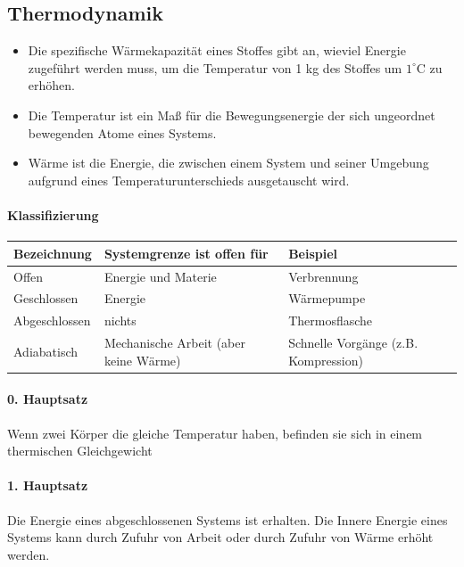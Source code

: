 \documentclass[
a4paper,
oneside,
landscape, 
8pt,
]{scrartcl}
\begin{document}
\begin{multicols*}{2}
\clearpage


\section{Thermodynamik}
\begin{itemize}
	\item Die spezifische Wärmekapazität eines Stoffes gibt an, wieviel Energie zugeführt werden muss, um die Temperatur von 1 kg des Stoffes um $1^\circ \text{C}$ zu erhöhen.
	\item Die Temperatur ist ein Maß für die Bewegungsenergie der sich ungeordnet bewegenden Atome eines Systems.
	\item Wärme ist die Energie, die zwischen einem System und seiner Umgebung aufgrund eines Temperaturunterschieds ausgetauscht wird.
\end{itemize}

\paragraph{Klassifizierung}

\begin{tabbing}
	\begin{tabu} to \linewidth {l X l}
		\toprule
		Bezeichnung & Systemgrenze ist offen für & Beispiel \\
		\midrule
		Offen &	Energie und Materie	& Verbrennung \\
		Geschlossen	& Energie &	Wärmepumpe \\
		Abgeschlossen &	nichts & Thermosflasche \\
		Adiabatisch & Mechanische Arbeit (aber keine Wärme)	& Schnelle Vorgänge (z.B. Kompression) \\
		\bottomrule
	\end{tabu}
\end{tabbing}


\paragraph{0. Hauptsatz} Wenn zwei Körper die gleiche Temperatur haben, befinden sie sich in einem thermischen Gleichgewicht

\paragraph{1. Hauptsatz} Die Energie eines abgeschlossenen Systems ist erhalten.
Die Innere Energie eines Systems kann durch Zufuhr von Arbeit oder durch Zufuhr von Wärme erhöht werden.


\end{multicols*}
\end{document}
